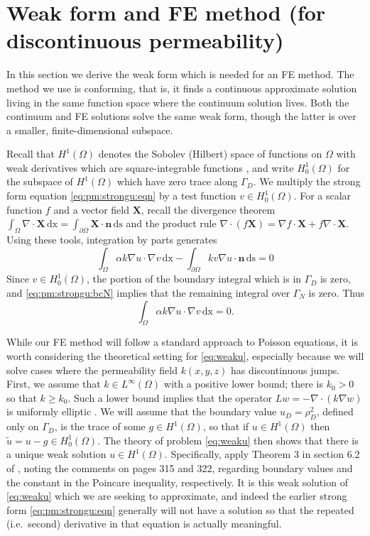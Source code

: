 \documentclass[11pt]{amsart}
\newcommand{\bn}{\mathbf{n}}
\newcommand{\bX}{\mathbf{X}}
\newcommand{\dx}{\mathrm{dx}}
\newcommand{\ds}{\mathrm{ds}}
\newcommand{\Div}{\nabla\cdot}
\newcommand{\grad}{\nabla}
\begin{document}
\section{Weak form and FE method (for discontinuous permeability)}

In this section we derive the weak form which is needed for an FE method.  The method we use is conforming, that is, it finds a continuous approximate solution living in the same function space where the continuum solution lives.  Both the continuum and FE solutions solve the same weak form, though the latter is over a smaller, finite-dimensional subspace.

Recall that $H^1(\Omega)$ denotes the Sobolev (Hilbert) space of functions on $\Omega$ with weak derivatives which are square-integrable functions \citep[chapter 5]{Evans2010}, and write $H_0^1(\Omega)$ for the subspace of $H^1(\Omega)$ which have zero trace along $\Gamma_D$.  We multiply the strong form equation \eqref{eq:pm:strongu:eqn} by a test function $v \in H_0^1(\Omega)$.  For a scalar function $f$ and a vector field $\bX$, recall the divergence theorem $\int_\Omega \Div \bX\,\dx = \int_{\partial \Omega} \bX\cdot \bn\,\ds$ and the product rule $\Div(f\bX) = \grad f \cdot \bX + f \Div \bX$.  Using these tools, integration by parts generates
\begin{equation}
\int_\Omega \alpha k \grad u \cdot \grad v\,\dx - \int_{\partial\Omega} k v \grad u \cdot \bn\,\ds = 0 \label{eq:weaku:early}
\end{equation}
Since $v\in H_0^1(\Omega)$, the portion of the boundary integral which is in $\Gamma_D$ is zero, and \eqref{eq:pm:strongu:bcN} implies that the remaining integral over $\Gamma_N$ is zero.  Thus 
\begin{equation}
\int_\Omega \alpha k \grad u \cdot \grad v\,\dx = 0. \label{eq:weaku}
\end{equation}

While our FE method will follow a standard approach to Poisson equations, it is worth considering the theoretical setting for \eqref{eq:weaku}, especially because we will solve cases where the permeability field $k(x,y,z)$ has discontinuous jumps.  First, we assume that $k\in L^\infty(\Omega)$ with a positive lower bound; there is $k_0>0$ so that $k \ge k_0$.  Such a lower bound implies that the operator $L w = - \Div(k \grad w)$ is uniformly elliptic \citep[section 6.1]{Evans2010}.  We will assume that the boundary value $u_D = \rho_D^2$, defined only on $\Gamma_D$, is the trace of some $g\in H^1(\Omega)$, so that if $u\in H^1(\Omega)$ then $\tilde u = u - g \in H_0^1(\Omega)$.  The theory of problem \eqref{eq:weaku} then shows that there is a unique weak solution $u\in H^1(\Omega)$.  Specifically, apply Theorem 3 in section 6.2 of \citep{Evans2010}, noting the comments on pages 315 and 322, regarding boundary values and the constant in the Poincare inequality, respectively.  It is this weak solution of \eqref{eq:weaku} which we are seeking to approximate, and indeed the earlier strong form \eqref{eq:pm:strongu:eqn} generally will not have a solution so that the repeated (i.e.~second) derivative in that equation is actually meaningful.
\end{document}
